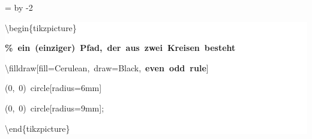 \begingroup
\ttfamily
{}
=\textwidth
\advance{} by -2\fboxsep
\noindent
\colorbox{background}
{%
\parbox{\dimen255}
{%
\rule[-0.5ex]{0pt}{2.5ex}\hspace*{0.0em}\textbackslash{}begin\{tikzpicture\}\\
\rule[-0.5ex]{0pt}{2.5ex}\hspace*{1.0em}\textcolor{G}{\textbf{\%~ein~(einziger)~Pfad,~der~aus~zwei~Kreisen~besteht}}\\
\rule[-0.5ex]{0pt}{2.5ex}\hspace*{1.0em}\textbackslash{}filldraw[fill=Cerulean,~draw=Black,~\textcolor{R}{\textbf{even~odd~rule}}]\\
\rule[-0.5ex]{0pt}{2.5ex}\hspace*{5.5em}(0,~0)~circle[radius=6mm]\\
\rule[-0.5ex]{0pt}{2.5ex}\hspace*{5.5em}(0,~0)~circle[radius=9mm];\\
\rule[-0.5ex]{0pt}{2.5ex}\hspace*{0.0em}\textbackslash{}end\{tikzpicture\}}%
}%
\endgroup
